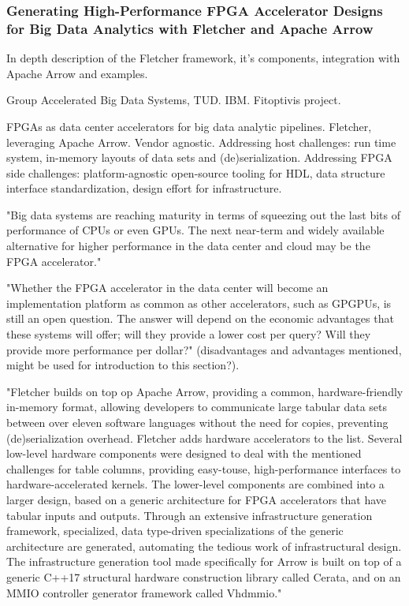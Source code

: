 
\subsubsection{Generating High-Performance FPGA Accelerator Designs for Big Data Analytics with Fletcher and Apache Arrow}
\cite{Peltenburg2021GeneratingArrow}
In depth description of the Fletcher framework, it's components, integration with Apache Arrow and examples.

Group Accelerated Big Data Systems, TUD. IBM. Fitoptivis project.

FPGAs as data center accelerators for big data analytic pipelines. Fletcher, leveraging Apache Arrow. Vendor agnostic. Addressing host challenges: run time system, in-memory layouts of data sets and (de)serialization. Addressing FPGA side challenges: platform-agnostic open-source tooling for HDL, data structure interface standardization, design effort for infrastructure. 

"Big data systems are reaching maturity in terms of
squeezing out the last bits of performance of CPUs or even
GPUs. The next near-term and widely available alternative
for higher performance in the data center and cloud may be
the FPGA accelerator."

"Whether the FPGA accelerator in the data center will
become an implementation platform as common as other
accelerators, such as GPGPUs, is still an open question. The
answer will depend on the economic advantages that these
systems will offer; will they provide a lower cost per query?
Will they provide more performance per dollar?" (disadvantages and advantages mentioned, might be used for introduction to this section?).

"Fletcher builds on top op Apache Arrow, providing a common, hardware-friendly in-memory format,
allowing developers to communicate large tabular data sets
between over eleven software languages without the need
for copies, preventing (de)serialization overhead. Fletcher
adds hardware accelerators to the list. Several low-level
hardware components were designed to deal with the
mentioned challenges for table columns, providing easy-touse,
high-performance interfaces to hardware-accelerated
kernels. The lower-level components are combined into
a larger design, based on a generic architecture for
FPGA accelerators that have tabular inputs and outputs.
Through an extensive infrastructure generation framework,
specialized, data type-driven specializations of the generic
architecture are generated, automating the tedious work
of infrastructural design. The infrastructure generation tool
made specifically for Arrow is built on top of a generic
C++17 structural hardware construction library called
Cerata, and on an MMIO controller generator framework
called Vhdmmio."

